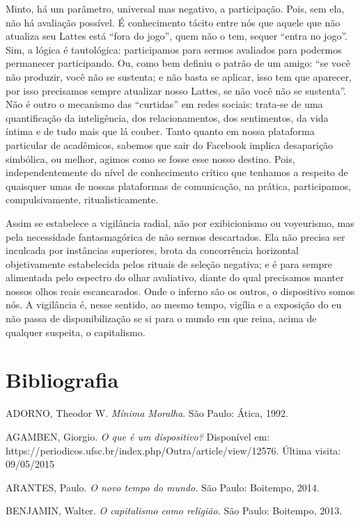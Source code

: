 Minto, há um parâmetro, universal mas negativo, a participação. Pois,
sem ela, não há avaliação possível. É conhecimento tácito entre nós que
aquele que não atualiza seu Lattes está ``fora do jogo'', quem não o
tem, sequer ``entra no jogo''. Sim, a lógica é tautológica: participamos
para sermos avaliados para podermos permanecer participando. Ou, como
bem definiu o patrão de um amigo: ``se você não produzir, você não se
sustenta; e não basta se aplicar, isso tem que aparecer, por isso
precisamos sempre atualizar nosso Lattes, se não você não se sustenta''.
Não é outro o mecanismo das ``curtidas'' em redes sociais: trata-se de
uma quantificação da inteligência, dos relacionamentos, dos sentimentos,
da vida íntima e de tudo mais que lá couber. Tanto quanto em nossa
plataforma particular de acadêmicos, sabemos que sair do Facebook
implica desaparição simbólica, ou melhor, agimos como se fosse esse
nosso destino. Pois, independentemente do nível de conhecimento crítico
que tenhamos a respeito de quaisquer umas de nossas plataformas de
comunicação, na prática, participamos, compulsivamente,
ritualisticamente.

Assim se estabelece a vigilância radial, não por exibicionismo ou
voyeurismo, mas pela necessidade fantasmagórica de não sermos
descartados. Ela não precisa ser inculcada por instâncias superiores,
brota da concorrência horizontal objetivamente estabelecida pelos
rituais de seleção negativa; e é para sempre alimentada pelo espectro do
olhar avaliativo, diante do qual precisamos manter nossos olhos reais
escancarados. Onde o inferno são os outros, o dispositivo somos nós. A
vigilância é, nesse sentido, ao mesmo tempo, vigília e a exposição do eu
não passa de disponibilização se si para o mundo em que reina, acima de
qualquer suspeita, o capitalismo.

\section{Bibliografia}

ADORNO, Theodor W. \emph{Mínima Moralha}. São Paulo: Ática, 1992.

AGAMBEN, Giorgio. \emph{O que é um dispositivo?} Disponível em:
https://periodicos.ufsc.br/index.php/Outra/article/view/12576. Última
visita: 09/05/2015

ARANTES, Paulo. \emph{O novo tempo do mundo.} São Paulo: Boitempo, 2014.

BENJAMIN, Walter. \emph{O capitalismo como religião.} São Paulo:
Boitempo, 2013.

